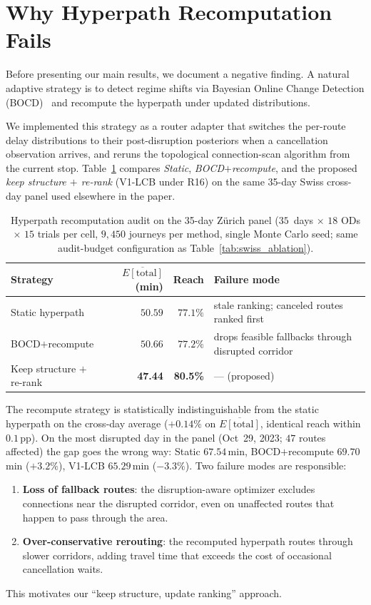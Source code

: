 \documentclass[11pt]{article}
\theoremstyle{definition}
\theoremstyle{remark}
\begin{document}
\section{Why Hyperpath Recomputation Fails}
\label{sec:recomp}

Before presenting our main results, we document a negative finding. A natural adaptive strategy is to detect regime shifts via Bayesian Online Change Detection (BOCD)~\cite{adams2007} and recompute the hyperpath under updated distributions.

We implemented this strategy as a router adapter that switches the per-route delay distributions to their post-disruption posteriors when a cancellation observation arrives, and reruns the topological connection-scan algorithm from the current stop. Table~\ref{tab:recompute_audit} compares \emph{Static}, \emph{BOCD$+$recompute}, and the proposed \emph{keep structure $+$ re-rank} (V1-LCB under R16) on the same 35-day Swiss cross-day panel used elsewhere in the paper.

\begin{table}[h]
\centering
\caption{Hyperpath recomputation audit on the 35-day Z\"urich
panel ($35$~days $\times$ $18$ ODs $\times$ $15$ trials per cell,
$9{,}450$ journeys per method, single Monte Carlo seed; same
audit-budget configuration as Table~\ref{tab:swiss_ablation}).}
\label{tab:recompute_audit}
\scriptsize
\begin{tabular}{lrrl}
\toprule
Strategy & $\overline{E[\mathrm{total}]}$ (min) & Reach & Failure mode \\
\midrule
Static hyperpath           & $50.59$ & $77.1\%$ & stale ranking; canceled routes ranked first \\
BOCD$+$recompute           & $50.66$ & $77.2\%$ & drops feasible fallbacks through disrupted corridor \\
Keep structure $+$ re-rank & \textbf{47.44} & \textbf{80.5\%} & --- (proposed) \\
\bottomrule
\end{tabular}
\end{table}

\noindent
The recompute strategy is statistically indistinguishable from the static hyperpath on the cross-day average ($+0.14\%$ on $\overline{E[\mathrm{total}]}$, identical reach within $0.1$\,pp). On the most disrupted day in the panel (Oct~29, 2023; $47$ routes affected) the gap goes the wrong way: Static $67.54$\,min, BOCD$+$recompute $69.70$\,min ($+3.2\%$), V1-LCB $65.29$\,min ($-3.3\%$). Two failure modes are responsible:
\begin{enumerate}
    \item \textbf{Loss of fallback routes}: the disruption-aware optimizer excludes connections near the disrupted corridor, even on unaffected routes that happen to pass through the area.
    \item \textbf{Over-conservative rerouting}: the recomputed hyperpath routes through slower corridors, adding travel time that exceeds the cost of occasional cancellation waits.
\end{enumerate}
This motivates our ``keep structure, update ranking'' approach.
\end{document}

